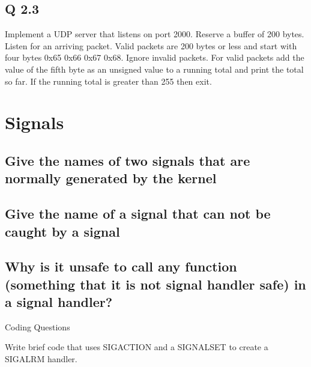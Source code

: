 \subsection{Q 2.3}\label{q-2.3}

Implement a UDP server that listens on port 2000. Reserve a buffer of 200 bytes. Listen for an arriving packet. Valid packets are 200 bytes or less and start with four bytes 0x65 0x66 0x67 0x68. Ignore invalid packets. For valid packets add the value of the fifth byte as an unsigned value to a running total and print the total so far. If the running total is greater than 255 then exit.

\section{Signals}

\subsection{Give the names of two signals that are normally generated by the kernel}\label{give-the-names-of-two-signals-that-are-normally-generated-by-the-kernel}

\subsection{Give the name of a signal that can not be caught by a signal}\label{give-the-name-of-a-signal-that-can-not-be-caught-by-a-signal}

\subsection{Why is it unsafe to call any function (something that it is not signal handler safe) in a signal handler?}\label{why-is-it-unsafe-to-call-any-function-something-that-it-is-not-signal-handler-safe-in-a-signal-handler}

Coding Questions

Write brief code that uses SIGACTION and a SIGNALSET to create a SIGALRM handler.

